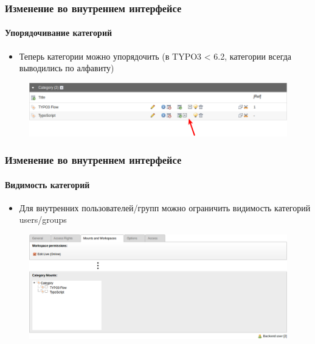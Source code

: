 
\begin{frame}[fragile]
	\frametitle{Изменение во внутреннем интерфейсе}
	\framesubtitle{Упорядочивание категорий}

 	\begin{itemize}
		\item Теперь категории можно упорядочить\newline
			\small(в TYPO3 < 6.2, категории всегда выводились по алфавиту)\normalsize
	\end{itemize}

	\begin{figure}
		\includegraphics[width=0.95\linewidth]{Images/BackendChanges/CategorySorting.png}
	\end{figure}

\end{frame}


\begin{frame}[fragile]
	\frametitle{Изменение во внутреннем интерфейсе}
	\framesubtitle{Видимость категорий}

 	\begin{itemize}
		\item Для внутренних пользователей/групп можно ограничить видимость категорий
		users/groups
	\end{itemize}

	\begin{figure}
		\includegraphics[width=0.95\linewidth]{Images/BackendChanges/CategoryVisibility.png}
	\end{figure}

\end{frame}

